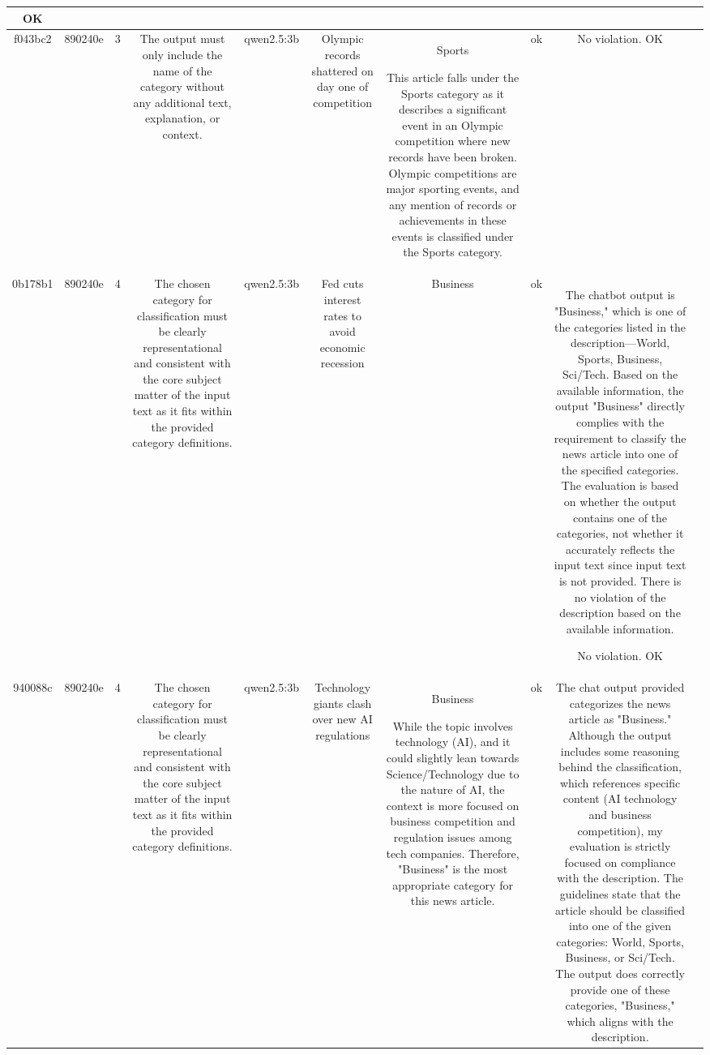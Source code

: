 \begin{table}[h!]
\begin{tabular}{|c|c|c|c|c|c|c|c|c|c|}
OK & \\
\hline
f043bc2 & 890240e & 3 & The output must only include the name of the category without any additional text, explanation, or context. & qwen2.5:3b & Olympic records shattered on day one of competition & Sports

This article falls under the Sports category as it describes a significant event in an Olympic competition where new records have been broken. Olympic competitions are major sporting events, and any mention of records or achievements in these events is classified under the Sports category. & ok & No violation.
OK & \\
\hline
0b178b1 & 890240e & 4 & The chosen category for classification must be clearly representational and consistent with the core subject matter of the input text as it fits within the provided category definitions. & qwen2.5:3b & Fed cuts interest rates to avoid economic recession & Business & ok & The chatbot output is "Business," which is one of the categories listed in the description—World, Sports, Business, Sci/Tech. Based on the available information, the output "Business" directly complies with the requirement to classify the news article into one of the specified categories. The evaluation is based on whether the output contains one of the categories, not whether it accurately reflects the input text since input text is not provided. There is no violation of the description based on the available information.

No violation.
OK & \\
\hline
940088c & 890240e & 4 & The chosen category for classification must be clearly representational and consistent with the core subject matter of the input text as it fits within the provided category definitions. & qwen2.5:3b & Technology giants clash over new AI regulations & Business

While the topic involves technology (AI), and it could slightly lean towards Science/Technology due to the nature of AI, the context is more focused on business competition and regulation issues among tech companies. Therefore, "Business" is the most appropriate category for this news article. & ok & The chat output provided categorizes the news article as "Business." Although the output includes some reasoning behind the classification, which references specific content (AI technology and business competition), my evaluation is strictly focused on compliance with the description. The guidelines state that the article should be classified into one of the given categories: World, Sports, Business, or Sci/Tech. The output does correctly provide one of these categories, "Business," which aligns with the description.


\end{tabular}
\end{table}
